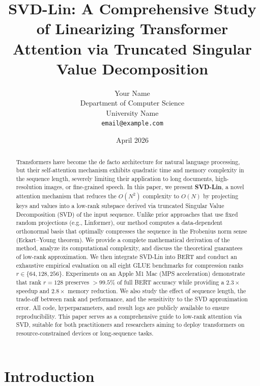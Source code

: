 \documentclass[twocolumn]{article}
\title{SVD-Lin: A Comprehensive Study of Linearizing Transformer Attention via Truncated Singular Value Decomposition}
\author{
    Your Name \\
    Department of Computer Science\\
    University Name\\
    \texttt{email@example.com}
}
\date{April 2026}
\begin{document}
\maketitle

\begin{abstract}
Transformers have become the de facto architecture for natural language processing, but their self-attention mechanism exhibits quadratic time and memory complexity in the sequence length, severely limiting their application to long documents, high-resolution images, or fine-grained speech. In this paper, we present \textbf{SVD-Lin}, a novel attention mechanism that reduces the $O(N^2)$ complexity to $O(N)$ by projecting keys and values into a low-rank subspace derived via truncated Singular Value Decomposition (SVD) of the input sequence. Unlike prior approaches that use fixed random projections (e.g., Linformer), our method computes a data-dependent orthonormal basis that optimally compresses the sequence in the Frobenius norm sense (Eckart–Young theorem). We provide a complete mathematical derivation of the method, analyze its computational complexity, and discuss the theoretical guarantees of low-rank approximation. We then integrate SVD-Lin into BERT and conduct an exhaustive empirical evaluation on all eight GLUE benchmarks for compression ranks $r \in \{64, 128, 256\}$. Experiments on an Apple M1 Mac (MPS acceleration) demonstrate that rank $r=128$ preserves $>99.5\%$ of full BERT accuracy while providing a $2.3\times$ speedup and $2.8\times$ memory reduction. We also study the effect of sequence length, the trade-off between rank and performance, and the sensitivity to the SVD approximation error. All code, hyperparameters, and result logs are publicly available to ensure reproducibility. This paper serves as a comprehensive guide to low-rank attention via SVD, suitable for both practitioners and researchers aiming to deploy transformers on resource-constrained devices or long-sequence tasks.
\end{abstract}

\section{Introduction}
\end{document}
